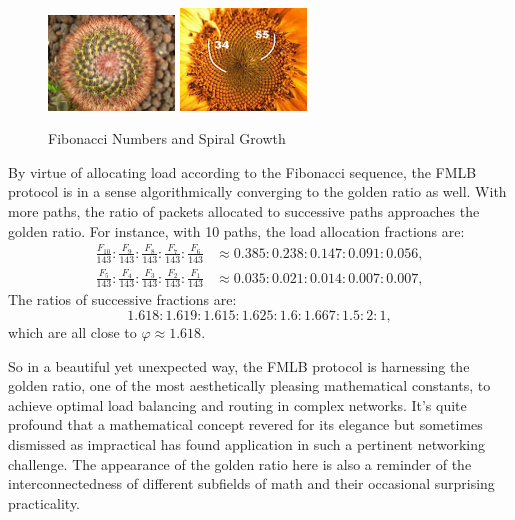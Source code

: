 \documentclass[12pt]{article}
\begin{document}
\begin{figure}[ht]
  \centering
  \includegraphics[width=0.3\textwidth]{./images/Cactus.png}
  \includegraphics[width=0.3\textwidth]{./images/Sunflower.png}
  \caption{Fibonacci Numbers and Spiral Growth}
  \label{fig:cactus_spiral}
  \end{figure}

By virtue of allocating load according to the Fibonacci sequence, the FMLB protocol is in a sense algorithmically converging to the golden ratio as well. With more paths, the ratio of packets allocated to successive paths approaches the golden ratio. For instance, with 10 paths, the load allocation fractions are:
\[
\begin{aligned}
\frac{F_{10}}{143} : \frac{F_9}{143} : \frac{F_8}{143} : \frac{F_7}{143} : \frac{F_6}{143} &\approx 0.385 : 0.238 : 0.147 : 0.091 : 0.056, \\
\frac{F_5}{143} : \frac{F_4}{143} : \frac{F_3}{143} : \frac{F_2}{143} : \frac{F_1}{143} &\approx 0.035 : 0.021 : 0.014 : 0.007 : 0.007,
\end{aligned}
\]
The ratios of successive fractions are:
\[
1.618 : 1.619 : 1.615 : 1.625 : 1.6 : 1.667 : 1.5 : 2 : 1,
\]
which are all close to $\varphi \approx 1.618$.

So in a beautiful yet unexpected way, the FMLB protocol is harnessing the golden ratio, one of the most aesthetically pleasing mathematical constants, to achieve optimal load balancing and routing in complex networks. It's quite profound that a mathematical concept revered for its elegance but sometimes dismissed as impractical has found application in such a pertinent networking challenge. The appearance of the golden ratio here is also a reminder of the interconnectedness of different subfields of math and their occasional surprising practicality.
\end{document}
